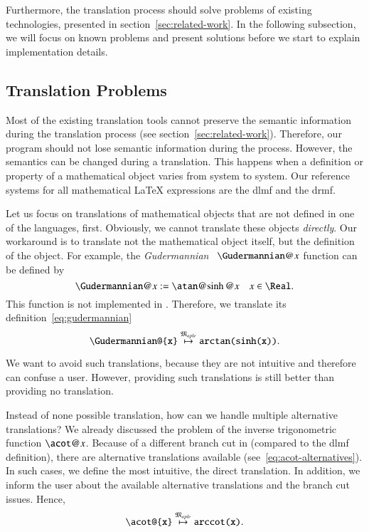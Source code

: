 Furthermore, the translation process should solve problems of existing technologies, presented in section~\ref{sec:related-work}. In the following subsection, we will focus on known problems and present solutions before we start to explain implementation details.

\subsection{Translation Problems}
Most of the existing translation tools cannot preserve the semantic information during the translation process (see section~\ref{sec:related-work}). Therefore, our program should not lose semantic information during the process. However, the semantics can be changed during a translation. This happens when a definition or property of a mathematical object varies from system to system. Our reference systems for all mathematical \LaTeX{} expressions are the \gls{dlmf} and the \gls{drmf}.

Let us focus on translations of mathematical objects that are not defined in one of the languages, first. Obviously, we cannot translate these objects \textit{directly}. Our workaround is to translate not the mathematical object itself, but the definition of the object. For example, the \textit{Gudermannian}~\cite[(4.23.10)]{NIST:DLMF} $\Gudermannian@{x}$ function can be defined by
\begin{equation}\label{eq:gudermannian}
\Gudermannian@{x} := \atan@{\sinh@{x}} \quad x \in \Real.
\end{equation}
This function is not implemented in \Maple. Therefore, we translate its definition~\eqref{eq:gudermannian}
\begin{equation}\label{eq:guder-trans}
\verb|\Gudermannian@{x}| \overset{\langMaple}{\mapsto} \texttt{arctan(sinh(x))}.
\end{equation}

We want to avoid such translations, because they are not intuitive and therefore can confuse a user. However, providing such translations is still better than providing no translation.

Instead of none possible translation, how can we handle multiple alternative translations? We already discussed the problem of the inverse trigonometric function $\acot@{x}$. Because of a different branch cut in \Maple{} (compared to the \gls{dlmf} definition), there are alternative translations available (see~\eqref{eq:acot-alternatives}). In such cases, we define the most intuitive, the direct translation. In addition, we inform the user about the available alternative translations and the branch cut issues. Hence,
\begin{equation}
\verb|\acot@{x}| \overset{\langMaple}{\mapsto} \texttt{arccot(x)}.
\end{equation}

